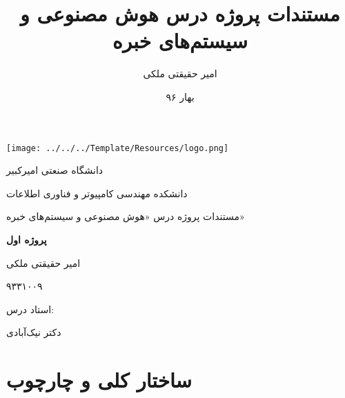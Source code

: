 \documentclass{report}
\title{مستندات پروژه درس هوش مصنوعی و سیستم‌های خبره}
\author{امیر حقیقتی ملکی}
\date{بهار ۹۶}
\theoremstyle{definition}
\begin{document}
		\begin{titlepage}
		\centering
		\texttt{[image: ../../../Template/Resources/logo.png]}\par\vspace{1cm}
		{\scshape\LARGE دانشگاه صنعتی امیرکبیر \par}
		{\scshape\LARGE دانشکده مهندسی کامپیوتر و فناوری اطلاعات \par}
		\vspace{1cm}
		{\scshape\Large 
			مستندات پروژه درس
			«هوش مصنوعی و سیستم‌های خبره»
			\par}
		\vspace{1.5cm}
		{\huge\bfseries 
			پروژه اول
			\par}
		\vspace{2cm}
		{\Large امیر حقیقتی ملکی\par}
		{\Large ۹۳۳۱۰۰۹\par}
		\vfill
		استاد درس:\par
		دکتر نیک‌آبادی
		\vfill
		
		{\large {}\par}
	\end{titlepage}
	\newpage
	\tableofcontents
	\newpage
	\chapter{ساختار کلی و چارچوب}
\end{document}
